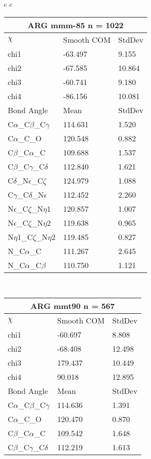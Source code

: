 \begin{longtable}{ c c }
\begin{tabular}{ l l l }
  \toprule
  \multicolumn{3}{c}{ARG \textbf{mmm-85} n = 1022} \\ \toprule
  $\chi$       & Smooth COM & StdDev \\ \midrule
  chi1 & -63.497 & 9.155 \\ 
  chi2 & -67.585 & 10.864 \\ 
  chi3 & -60.741 & 9.180 \\ 
  chi4 & -86.156 & 10.081 \\ \midrule
  Bond Angle   & Mean     & StdDev \\ \midrule
  C$\alpha$\_C$\beta$\_C$\gamma$ & 114.631 & 1.520\\
  C$\alpha$\_C\_O & 120.548 & 0.882\\
  C$\beta$\_C$\alpha$\_C & 109.688 & 1.537\\
  C$\beta$\_C$\gamma$\_C$\delta$ & 112.840 & 1.621\\
  C$\delta$\_N$\epsilon$\_C$\zeta$ & 124.979 & 1.088\\
  C$\gamma$\_C$\delta$\_N$\epsilon$ & 112.452 & 2.260\\
  N$\epsilon$\_C$\zeta$\_N$\eta$1 & 120.857 & 1.007\\
  N$\epsilon$\_C$\zeta$\_N$\eta$2 & 119.638 & 0.965\\
  N$\eta$1\_C$\zeta$\_N$\eta$2 & 119.485 & 0.827\\
  N\_C$\alpha$\_C & 111.267 & 2.645\\
  N\_C$\alpha$\_C$\beta$ & 110.750 & 1.121\\
  \bottomrule
  \end{tabular}
  \\
  \begin{tabular}{ l l l }
  \toprule
  \multicolumn{3}{c}{ARG \textbf{mmt90} n = 567} \\ \toprule
  $\chi$       & Smooth COM & StdDev \\ \midrule
  chi1 & -60.697 & 8.808 \\ 
  chi2 & -68.408 & 12.498 \\ 
  chi3 & 179.437 & 10.449 \\ 
  chi4 & 90.018 & 12.895 \\ \midrule
  Bond Angle   & Mean     & StdDev \\ \midrule
  C$\alpha$\_C$\beta$\_C$\gamma$ & 114.636 & 1.391\\
  C$\alpha$\_C\_O & 120.470 & 0.870\\
  C$\beta$\_C$\alpha$\_C & 109.542 & 1.648\\
  C$\beta$\_C$\gamma$\_C$\delta$ & 112.219 & 1.613\\

\end{tabular}
\end{longtable}

